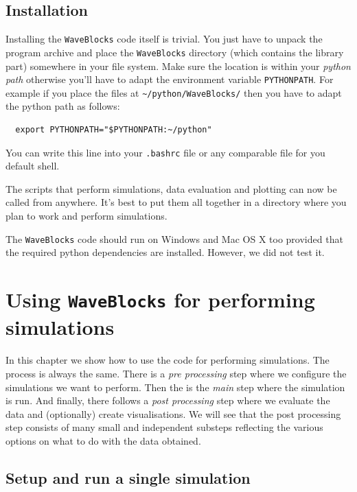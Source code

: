 \documentclass[a4paper,10pt]{report}
\begin{document}
\section{Installation}

Installing the \texttt{WaveBlocks} code itself is trivial. You just have to unpack
the program archive and place the \texttt{WaveBlocks} directory (which contains the
library part) somewhere in your file system. Make sure the location is within
your \textit{python path} otherwise you'll have to adapt the environment variable
\texttt{PYTHONPATH}. For example if you place the files at \verb|~/python/WaveBlocks/|
then you have to adapt the python path as follows:

\begin{verbatim}
  export PYTHONPATH="$PYTHONPATH:~/python"
\end{verbatim}

You can write this line into your \texttt{.bashrc} file or any comparable file
for you default shell.

The scripts that perform simulations, data evaluation and plotting can now be
called from anywhere. It's best to put them all together in a directory where
you plan to work and perform simulations.

The \texttt{WaveBlocks} code should run on Windows and Mac OS X too provided
that the required python dependencies are installed. However, we did not test it.


\chapter{Using \texttt{WaveBlocks} for performing simulations}

In this chapter we show how to use the code for performing simulations. The process
is always the same. There is a \emph{pre processing} step where we configure the
simulations we want to perform. Then the is the \emph{main} step where the simulation
is run. And finally, there follows a \emph{post processing} step where we evaluate
the data and (optionally) create visualisations. We will see that the post processing
step consists of many small and independent substeps reflecting the various options
on what to do with the data obtained.

\section{Setup and run a single simulation}
\end{document}
